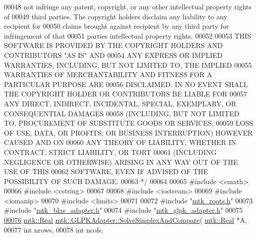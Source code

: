 \begin{DoxyCode}
00048 \textcolor{comment}{not infringe any patent, copyright, or any other intellectual property rights of}
00049 \textcolor{comment}{third parties. The copyright holders disclaim any liability to any recipient for}
00050 \textcolor{comment}{claims brought against recipient by any third party for infringement of that}
00051 \textcolor{comment}{parties intellectual property rights.}
00052 \textcolor{comment}{}
00053 \textcolor{comment}{THIS SOFTWARE IS PROVIDED BY THE COPYRIGHT HOLDERS AND CONTRIBUTORS "AS IS" AND}
00054 \textcolor{comment}{ANY EXPRESS OR IMPLIED WARRANTIES, INCLUDING, BUT NOT LIMITED TO, THE IMPLIED}
00055 \textcolor{comment}{WARRANTIES OF MERCHANTABILITY AND FITNESS FOR A PARTICULAR PURPOSE ARE}
00056 \textcolor{comment}{DISCLAIMED. IN NO EVENT SHALL THE COPYRIGHT HOLDER OR CONTRIBUTORS BE LIABLE FOR}
00057 \textcolor{comment}{ANY DIRECT, INDIRECT, INCIDENTAL, SPECIAL, EXEMPLARY, OR CONSEQUENTIAL DAMAGES}
00058 \textcolor{comment}{(INCLUDING, BUT NOT LIMITED TO, PROCUREMENT OF SUBSTITUTE GOODS OR SERVICES;}
00059 \textcolor{comment}{LOSS OF USE, DATA, OR PROFITS; OR BUSINESS INTERRUPTION) HOWEVER CAUSED AND ON}
00060 \textcolor{comment}{ANY THEORY OF LIABILITY, WHETHER IN CONTRACT, STRICT LIABILITY, OR TORT}
00061 \textcolor{comment}{(INCLUDING NEGLIGENCE OR OTHERWISE) ARISING IN ANY WAY OUT OF THE USE OF THIS}
00062 \textcolor{comment}{SOFTWARE, EVEN IF ADVISED OF THE POSSIBILITY OF SUCH DAMAGE.}
00063 \textcolor{comment}{*/}
00064 
00065 \textcolor{preprocessor}{#include <cmath>}
00066 \textcolor{preprocessor}{#include <cstring>}
00067 
00068 \textcolor{preprocessor}{#include <iostream>}
00069 \textcolor{preprocessor}{#include <iomanip>}
00070 \textcolor{preprocessor}{#include <limits>}
00071 
00072 \textcolor{preprocessor}{#include "\hyperlink{mtk__roots_8h}{mtk\_roots.h}"}
00073 \textcolor{preprocessor}{#include "\hyperlink{mtk__blas__adapter_8h}{mtk\_blas\_adapter.h}"}
00074 \textcolor{preprocessor}{#include "\hyperlink{mtk__glpk__adapter_8h}{mtk\_glpk\_adapter.h}"}
00075 
\hypertarget{mtk__glpk__adapter_8cc_source_l00076}{}\hyperlink{classmtk_1_1GLPKAdapter_a834480aca83e3c0d09fdab7fdb7e8a3f}{00076} \hyperlink{group__c01-roots_gac080bbbf5cbb5502c9f00405f894857d}{mtk::Real} \hyperlink{classmtk_1_1GLPKAdapter_a834480aca83e3c0d09fdab7fdb7e8a3f}{mtk::GLPKAdapter::SolveSimplexAndCompare}(
      \hyperlink{group__c01-roots_gac080bbbf5cbb5502c9f00405f894857d}{mtk::Real} *A,
00077                                                    \textcolor{keywordtype}{int} nrows,
00078                                                    \textcolor{keywordtype}{int} ncols,

\end{DoxyCode}
